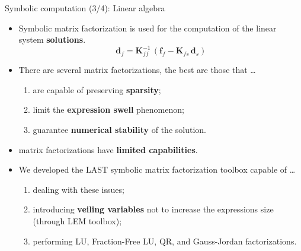 \begin{frame}{Symbolic computation (3/4): Linear algebra}
  \begin{itemize}
    \item Symbolic matrix factorization is used for the computation of the linear system \textbf{solutions}.
    \begin{equation*}
      \mathbf{d}_{f} = \mathbf{K}_{ff}^{-1}\,\left(\mathbf{f}_{f} - \mathbf{K}_{fs}\,\mathbf{d}_{s}\right)
    \end{equation*}
    \item There are several matrix factorizations, the best are those that \dots
    \\[0.5em]
    \begin{enumerate}
      \item are capable of preserving \textbf{sparsity};
      \\[0.5em]
      \item limit the \textbf{expression swell} phenomenon;
      \\[0.5em]
      \item guarantee \textbf{numerical stability} of the solution.
      \\[1.0em]
    \end{enumerate}
    \item \Maple{} matrix factorizations have \textbf{limited capabilities}. \\[1.0em]
    \item We developed the \ac{LAST} symbolic matrix factorization toolbox capable of \dots  \\[0.5em]
    \begin{enumerate}
      \item dealing with these \Maple{} issues; \\[0.5em]
      \item introducing \textbf{veiling variables} not to increase the expressions size (through \ac{LEM} toolbox); \\[0.5em]
      \item performing LU, Fraction-Free LU, QR, and Gauss-Jordan factorizations. \\[1.5em]
    \end{enumerate}
  \end{itemize}
\end{frame}

